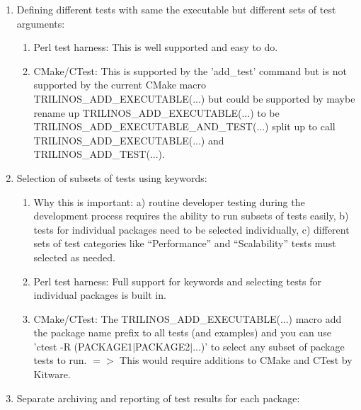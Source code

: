 \documentclass[pdf,ps2pdf,11pt]{SANDreport}
\begin{document}
\begin{enumerate}

{}\item Defining different tests with same the executable but
different sets of test arguments:

  \begin{enumerate}

  {}\item Perl test harness: This is well supported and easy to do.

  {}\item CMake/CTest: This is supported by the 'add\_test' command
  but is not supported by the current CMake macro
  TRILINOS\_ADD\_EXECUTABLE(...) but could be supported by maybe
  rename up TRILINOS\_ADD\_EXECUTABLE(...) to be
  TRILINOS\_ADD\_EXECUTABLE\_AND\_TEST(...) split up to call
  TRILINOS\_ADD\_EXECUTABLE(...) and TRILINOS\_ADD\_TEST(...).

  \end{enumerate}

{}\item Selection of subsets of tests using keywords:

  \begin{enumerate}

  {}\item Why this is important: a) routine developer testing during
  the development process requires the ability to run subsets of tests
  easily, b) tests for individual packages need to be selected
  individually, c) different sets of test categories like
  ``Performance'' and ``Scalability'' tests must selected as needed.

  {}\item Perl test harness: Full support for keywords and selecting
  tests for individual packages is built in.

  {}\item CMake/CTest: The TRILINOS\_ADD\_EXECUTABLE(...) macro add
  the package name prefix to all tests (and examples) and you can
  use 'ctest -R (PACKAGE1$|$PACKAGE2$|$...)' to select any subset of
  package tests to run. $=>$ This would require additions to CMake
  and CTest by Kitware.

  \end{enumerate}

{}\item Separate archiving and reporting of test results for each
package:

  \begin{enumerate}


\end{enumerate}
\end{enumerate}
\end{document}
